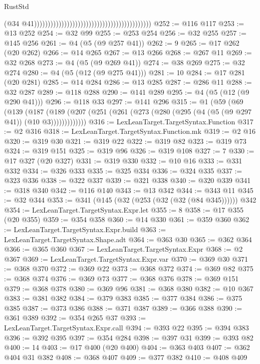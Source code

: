 \begin{lexlean}{RustStd}
\begin{coremodule}
                                                                                        (@34
                                                                                          @41)))))))))))))))))))))))))))))))))))))))))))
@252 := @116 @117
@253 := @13 @252
@254 := @32 @99
@255 := @253 @254
@256 := @32 @255
@257 := @145 @256
@261 := @4 (@5 (@9 @257 @41))
@262 := 9
@265 := @17 @262 (@20 @262)
@266 := @14 @265
@267 := @13 @266
@268 := @267 @11
@269 := @32 @268
@273 := @4 (@5 (@9 @269 @41))
@274 := @38 @269
@275 := @32 @274
@280 := @4 (@5 (@12 (@9 @275 @41)))
@281 := 10
@284 := @17 @281 (@20 @281)
@285 := @14 @284
@286 := @13 @285
@287 := @286 @11
@288 := @32 @287
@289 := @118 @288
@290 := @141 @289
@295 := @4 (@5 (@12 (@9 @290 @41)))
@296 := @118 @33
@297 := @141 @296
@315 := @1
    (@59
      (@69
        (@139
          (@187
            (@189 (@207 (@251 (@261 (@273 (@280 (@295 (@4 (@5 (@9 @297 @41)) (@10 @3)))))))))))))
@316 := LexLeanTarget.TargetSyntax.Function
@317 := @2 @316
@318 := LexLeanTarget.TargetSyntax.Function.mk
@319 := @2 @16
@320 := @319 @30
@321 := @319 @22
@322 := @319 @82
@323 := @319 @73
@324 := @319 @151
@325 := @319 @96
@326 := @319 @108
@327 := 7
@330 := @17 @327 (@20 @327)
@331 := @319 @330
@332 := @10 @16
@333 := @331 @332
@334 := @326 @333
@335 := @325 @334
@336 := @324 @335
@337 := @323 @336
@338 := @322 @337
@339 := @321 @338
@340 := @320 @339
@341 := @318 @340
@342 := @116 @140
@343 := @13 @342
@344 := @343 @11
@345 := @32 @344
@353 := @341 (@145 (@32 (@253 (@32 (@32 (@84 @345)))))) @342
@354 := LexLeanTarget.TargetSyntax.Expr.let
@355 := 8
@358 := @17 @355 (@20 @355)
@359 := @354 @358
@360 := @14 @330
@361 := @359 @360
@362 := LexLeanTarget.TargetSyntax.Expr.build
@363 := LexLeanTarget.TargetSyntax.Shape.adt
@364 := @363 @30
@365 := @362 @364
@366 := @365 @360
@367 := LexLeanTarget.TargetSyntax.Expr
@368 := @2 @367
@369 := LexLeanTarget.TargetSyntax.Expr.var
@370 := @369 @30
@371 := @368 @370
@372 := @369 @22
@373 := @368 @372
@374 := @369 @82
@375 := @368 @374
@376 := @369 @73
@377 := @368 @376
@378 := @369 @151
@379 := @368 @378
@380 := @369 @96
@381 := @368 @380
@382 := @10 @367
@383 := @381 @382
@384 := @379 @383
@385 := @377 @384
@386 := @375 @385
@387 := @373 @386
@388 := @371 @387
@389 := @366 @388
@390 := @361 @389
@392 := @354 @265 @37
@393 := LexLeanTarget.TargetSyntax.Expr.call
@394 := @393 @22
@395 := @394 @383
@396 := @392 @395
@397 := @354 @284
@398 := @397 @31
@399 := @393 @82
@400 := 14
@403 := @17 @400 (@20 @400)
@404 := @363 @403
@407 := @362 @404 @31 @382
@408 := @368 @407
@409 := @377 @382
@410 := @408 @409

\end{coremodule}
\end{lexlean}
